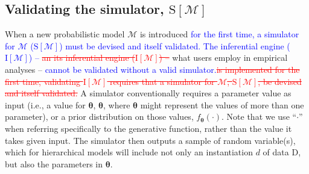 \documentclass[oneside]{article}
\begin{document}
\subsection*{Validating the simulator, $\text{S}[\mathcal{M}]$}
\label{verify-correctness-of-simulator-implementation}

When a new probabilistic model $\mathcal{M}$ is introduced \textcolor{blue}{for the first time, a simulator for $\mathcal{M}$ ($\text{S}[\mathcal{M}]$) must be devised and itself validated.
The inferential engine ($\text{I}[\mathcal{M}]$) -- }\textcolor{red}{\st{an its inferential engine ($\text{I}[\mathcal{M}]$) -- }}what users employ in empirical analyses -- \textcolor{blue}{cannot be validated without a valid simulator.}\textcolor{red}{\st{is implemented for the first time, validating $\text{I}[\mathcal{M}]$ requires that a simulator for $\mathcal{M}$, $\text{S}[\mathcal{M}]$, be devised and itself validated.}}
A simulator conventionally requires a parameter value as input (i.e., a value for $\boldsymbol{\theta}$, $\boldsymbol{\theta}$, where $\boldsymbol{\theta}$ might represent the values of more than one parameter), or a prior distribution on those values, $f_{\boldsymbol{\theta}}(\cdot)$. 
Note that we use ``$\cdot$'' when referring specifically to the generative function, rather than the value it takes given input.
The simulator then outputs a sample of random variable(s), which for hierarchical models will include not only an instantiation $d$ of data $\text{D}$, but also the parameters in $\boldsymbol{\theta}$.
\end{document}
